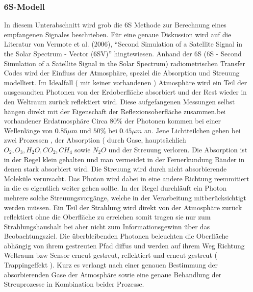 \documentclass[11pt]{report}
\begin{document}
\subsubsection{6S-Modell}
In diesem Unterabschnitt wird grob die 6S Methode zur Berechnung eines empfangenen Signales beschrieben. Für eine genaue Diskussion wird auf die Literatur von Vermote et al. (2006), "`Second Simulation of a Satellite Signal in the Solar Spectrum - Vector (6SV)"' hingtewiesen.\newline\newline
Anhand der 6S (6S - Second Simulation of a Satellite Signal in the Solar Spectrum) radiometrischen Transfer Codes wird der Einfluss der Atmosphäre, speziel die Absorption und Streuung modelliert. Im Idealfall ( mit keiner vorhandenen ) Atmosphäre wird ein Teil der ausgesandten Photonen von der Erdoberfläche absorbiert und der Rest wieder in den Weltraum zurück reflektiert wird. Diese aufgefangenen Messungen selbst hängen direkt mit der Eigenschaft der Reflexionsoberfläche zusammen.bei vorhandener Erdatmosphäre Circa $80 \%$ der Photonen kommen bei einer Wellenlänge von $0.85 \mu m$ und $50 \%$ bei $0.45 \mu m$ an. Jene Lichtteilchen gehen bei zwei Prozessen , der Absorption ( durch Gase, hauptsächlich $ O_2,O_3, H_2O,CO_2,CH_4$ sowie $N_2O$ und der Streuung verloren. Die Absorption ist in der Regel klein gehalten und man vermeidet in der Fernerkundung Bänder in denen stark absorbiert wird. Die Streuung wird durch nicht absorbierende Moleküle verursacht. Das Photon wird dabei in eine andere Richtung reemmitiert in die es eigentlich weiter gehen sollte. In der Regel durchläuft ein Photon mehrere solche Streuungsvorgänge, welche in der Verarbeitung mitberücksichtigt werden müssen.\newline
Ein Teil der Strahlung wird direkt von der Atmosphäre zurück reflektiert ohne die Oberfläche zu erreichen somit tragen sie nur zum Strahlungshaushalt bei aber nicht zum Informationsgewinn über das Beobachtungsziel. Die überbleibenden Photonen beleuchten die Oberfläche abhängig von ihrem gestreuten Pfad diffus und werden auf ihrem Weg Richtung Weltraum bzw Sensor erneut gestreut, reflektiert und erneut gestreut ( Trappingeffekt ). Kurz es verlangt nach einer genauen Bestimmung der absorbierenden Gase der Atmosphäre sowie eine genaue Behandlung der Streuprozesse in Kombination beider Prozesse. \newline

\end{document}
